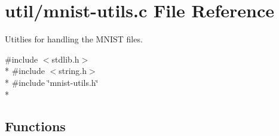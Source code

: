 \hypertarget{mnist-utils_8c}{}\section{util/mnist-\/utils.c File Reference}
\label{mnist-utils_8c}


Utitlies for handling the M\+N\+I\+S\+T files.  


{\ttfamily \#include $<$stdlib.\+h$>$}\\*
{\ttfamily \#include $<$string.\+h$>$}\\*
{\ttfamily \#include \char`\"{}mnist-\/utils.\+h\char`\"{}}\\*
\subsection*{Functions}
